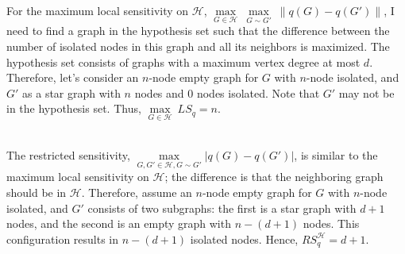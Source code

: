 \documentclass[12pt]{extarticle}
\begin{document}
\begin{comment}
\[ RS_{q}^{\mathcal{H}} = 
\begin{cases}
	d + 1 & \text{if } n \geq 2(d+1) \\
	n-(d+1) & \text{if } d+1 \leq n < 2(d+1)\\
	\text{Impossible} & \text{if }  n < d+1
\end{cases}
\]
\end{comment}
\\\\
 For the maximum local sensitivity on \(\mathcal{H}\), $\underset{G\in\mathcal{H}}{\max}\ \underset{G\sim G'}{\max}\ \| q(G) - q(G')\|$, I need to find a graph in the hypothesis set such that the difference between the number of isolated nodes in this graph and all its neighbors is maximized. The hypothesis set consists of graphs with a maximum vertex degree at most \(d\). Therefore, let's consider an \(n\)-node empty graph for \(G\) with \(n\)-node isolated, and \(G'\) as a star graph with \(n\) nodes and 0 nodes isolated. Note that \(G'\) may not be in the hypothesis set. Thus, \(\underset{G\in\mathcal{H}}{\max}\ LS_q = n\).
\\\\
 The restricted sensitivity, $\underset{G,G' \in \mathcal{H}, G \sim G'}{\max} |q(G) - q(G')|$, is similar to the maximum local sensitivity on $\mathcal{H}$; the difference is that the neighboring graph should be in $\mathcal{H}$. Therefore, assume an \(n\)-node empty graph for \(G\) with \(n\)-node isolated, and \(G'\) consists of two subgraphs: the first is a star graph with \(d+1\) nodes, and the second is an empty graph with \(n-(d+1)\) nodes. This configuration results in \(n-(d+1)\) isolated nodes. Hence, $RS_{q}^{\mathcal{H}} = d+1$.
\\\\
\\\\
\end{document}
